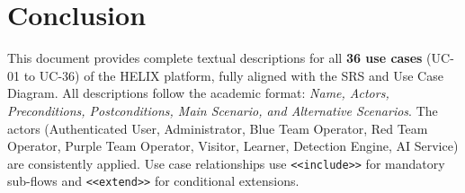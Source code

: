 \documentclass[12pt,a4paper]{report}
\begin{document}
\chapter*{Conclusion}

\begin{successbox}[title=Summary]
    This document provides complete textual descriptions for all \textbf{36 use cases}
    (UC-01 to UC-36) of the HELIX platform, fully aligned with the SRS and Use Case Diagram.
    All descriptions follow the academic format: \textit{Name, Actors, Preconditions,
    Postconditions, Main Scenario, and Alternative Scenarios}. The actors
    (Authenticated User, Administrator, Blue Team Operator, Red Team Operator,
    Purple Team Operator, Visitor, Learner, Detection Engine, AI Service) are consistently applied.
    Use case relationships use \texttt{<<include>>} for mandatory sub-flows and
    \texttt{<<extend>>} for conditional extensions.
\end{successbox}
\end{document}
